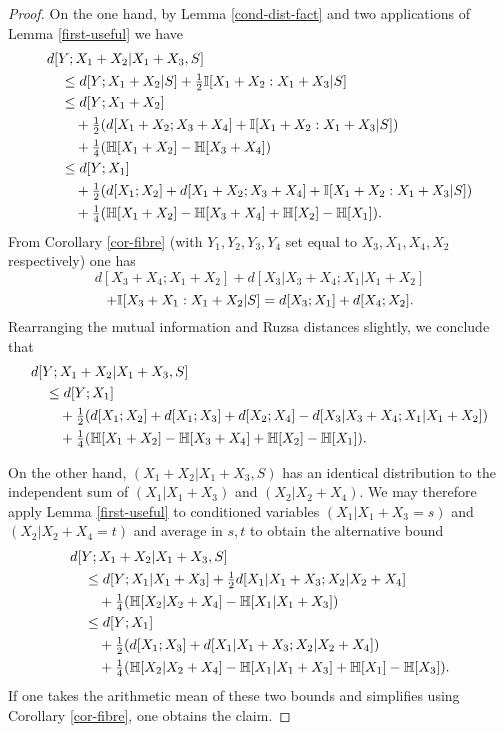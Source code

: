 \begin{proof}\leanok
  On the one hand, by Lemma \ref{cond-dist-fact} and two applications of Lemma \ref{first-useful} we have
  \begin{align*}
  &d[Y;X_1+X_2|X_1 + X_3, S] \\
  &\quad \leq d[Y;X_1+X_2|S] + \tfrac{1}{2} \mathbb{I}[X_1 + X_2 : X_1 + X_3|S] \\
  &\quad \leq d[Y;X_1+X_2]\\
  &\qquad + \tfrac{1}{2} (d[X_1+X_2;X_3+X_4] + \mathbb{I}[X_1 + X_2 : X_1 + X_3|S])\\
  &\qquad + \tfrac{1}{4} (\mathbb{H}[X_1+X_2] - \mathbb{H}[X_3+X_4])\\
  &\quad \leq d[Y;X_1] \\
  &\qquad + \tfrac{1}{2} (d[X_1;X_2] + d[X_1+X_2;X_3+X_4] + \mathbb{I}[X_1 + X_2 : X_1 + X_3|S])\\
  &\qquad + \tfrac{1}{4} (\mathbb{H}[X_1+X_2] - \mathbb{H}[X_3+X_4] + \mathbb{H}[X_2] - \mathbb{H}[X_1]).
  \end{align*}
  From Corollary \ref{cor-fibre} (with $Y_1,Y_2,Y_3,Y_4$ set equal to $X_3, X_1, X_4, X_2$ respectively) one has
  $$ d[X_3+X_4; X_1+X_2] + d[X_3|X_3+X_4; X_1|X_1+X_2] $$
  $$ + \mathbb{I}[X_3 + X_1 : X_1 + X_2|S] = d[X_3;X_1] + d[X_4;X_2].$$
Rearranging the mutual information and Ruzsa distances slightly, we conclude that
\begin{align*}
  &d[Y;X_1+X_2|X_1 + X_3, S] \\
  &\quad \leq d[Y;X_1] \\
  &\qquad + \tfrac{1}{2} (d[X_1;X_2] + d[X_1;X_3] + d[X_2;X_4] - d[X_3|X_3+X_4; X_1|X_1+X_2])\\
  &\qquad + \tfrac{1}{4} (\mathbb{H}[X_1+X_2] - \mathbb{H}[X_3+X_4] + \mathbb{H}[X_2] - \mathbb{H}[X_1]).
  \end{align*}



  On the other hand, $(X_1+X_2|X_1 + X_3, S)$ has an identical distribution to the independent sum of $(X_1|X_1+X_3)$ and $(X_2|X_2+X_4)$.  We may therefore apply Lemma \ref{first-useful} to conditioned variables $(X_1|X_1+X_3=s)$ and $(X_2|X_2+X_4=t)$ and average in $s,t$ to
  obtain the alternative bound
  \begin{align*}
  &  d[Y;X_1+X_2|X_1 + X_3, S] \\
  &\quad \leq d[Y;X_1|X_1+X_3] + \tfrac{1}{2} d[X_1|X_1+X_3; X_2|X_2+X_4] \\
  &\qquad + \tfrac{1}{4} (\mathbb{H}[X_2|X_2+X_4] - \mathbb{H}[X_1|X_1+X_3]) \\
  &\quad  \leq d[Y;X_1] \\
  &\qquad + \tfrac{1}{2} (d[X_1;X_3] + d[X_1|X_1+X_3;X_2|X_2+X_4])\\
  &\qquad + \tfrac{1}{4} (\mathbb{H}[X_2|X_2+X_4] - \mathbb{H}[X_1|X_1+X_3] + \mathbb{H}[X_1] - \mathbb{H}[X_3]).
  \end{align*}
  If one takes the arithmetic mean of these two bounds and simplifies using Corollary \ref{cor-fibre}, one obtains the claim.
\end{proof}

